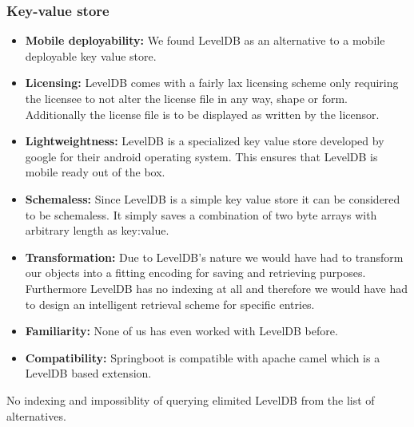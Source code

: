 \subsubsection{Key-value store}
\label{databaseKeyValueStore}
\begin{itemize}
\item \label{kv_req_one} \textbf{Mobile deployability:}
We found LevelDB as an alternative to a mobile deployable key value store.
\item \label{kv_req_two} \textbf{Licensing:}
LevelDB comes with a fairly lax licensing scheme only requiring the licensee to not alter the license file in any way,
shape or form. Additionally the license file is to be displayed as written by the licensor.
\item \label{kv_item_three} \textbf{Lightweightness:}
LevelDB is a specialized key value store developed by google for their android operating system.
This ensures that LevelDB is mobile ready out of the box.
\item \label{kv_req_four} \textbf{Schemaless:}
Since LevelDB is a simple key value store it can be considered to be schemaless.
It simply saves a combination of two byte arrays with arbitrary length as key:value.
\item \label{kv_req_five} \textbf{Transformation:}
Due to LevelDB's nature we would have had to transform our objects into a fitting encoding for saving and retrieving purposes.
Furthermore LevelDB has no indexing at all and therefore we would have had to design an intelligent retrieval scheme for specific entries.
\item \label{kv_req_six} \textbf{Familiarity:}
None of us has even worked with LevelDB before.
\item \label{kv_req_seven} \textbf{Compatibility:}
Springboot is compatible with apache camel which is a LevelDB based extension.
\end{itemize}
No indexing and impossiblity of querying elimited LevelDB from the list of alternatives.

